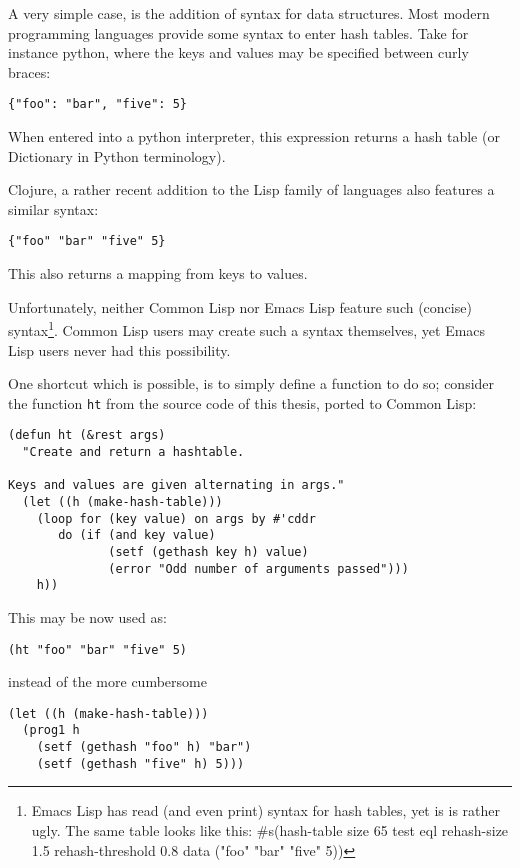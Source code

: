 \documentclass[a4paper]{article}
\begin{document}
A very simple case, is the addition of syntax for data structures.  Most modern
programming languages provide some syntax to enter hash tables.  Take for
instance python, where the keys and values may be specified between curly
braces: 

\begin{verbatim}
{"foo": "bar", "five": 5}
\end{verbatim}

When entered into a python interpreter, this expression returns a hash table (or
Dictionary in Python terminology).

Clojure, a rather recent addition to the Lisp family of languages also features
a similar syntax: 

\begin{verbatim}
{"foo" "bar" "five" 5}
\end{verbatim}

This also returns a mapping from keys to values.

Unfortunately, neither Common Lisp nor Emacs Lisp feature such (concise) syntax\footnote{Emacs Lisp has read (and even print) syntax for hash tables, yet is is rather
ugly.  The same table looks like this: \#s(hash-table size 65 test eql
rehash-size 1.5 rehash-threshold 0.8 data ("foo" "bar" "five" 5))}.
Common Lisp users may create such a syntax themselves, yet Emacs Lisp users never had
this possibility.

One shortcut which is possible, is to simply define a function to do so;
consider the function \texttt{ht} from the source code of this thesis, ported
to Common Lisp:

\begin{verbatim}
(defun ht (&rest args)
  "Create and return a hashtable.

Keys and values are given alternating in args."
  (let ((h (make-hash-table)))
    (loop for (key value) on args by #'cddr
       do (if (and key value)
              (setf (gethash key h) value)
              (error "Odd number of arguments passed")))
    h))
\end{verbatim}

This may be now used as:

\begin{verbatim}
(ht "foo" "bar" "five" 5)
\end{verbatim}

instead of the more cumbersome

\begin{verbatim}
(let ((h (make-hash-table)))
  (prog1 h
    (setf (gethash "foo" h) "bar")
    (setf (gethash "five" h) 5)))
\end{verbatim}
\end{document}
